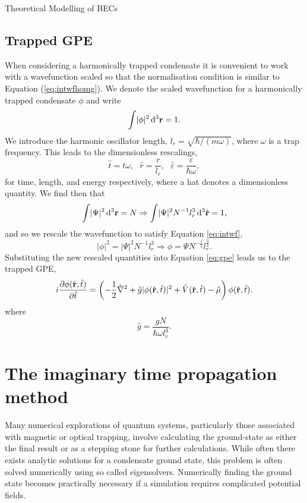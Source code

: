 \begin{chapter}{\label{cha:theoretical_model}Theoretical Modelling of BECs}
	\subsection{\label{section:gpedimlesstrap} Trapped GPE}
		When considering a harmonically trapped condensate it is convenient to work with a wavefunction scaled so that the normalisation condition is similar to Equation (\ref{eq:intwfhomg}). We denote the scaled wavefunction for a harmonically trapped condensate $\phi$ and write
		\begin{equation}\label{eq:intwf}
			\int \! |\phi|^2 \, \mathrm{d}^3{\bf r} = 1.
		\end{equation}
		We introduce the harmonic oscillator length, $l_r = \sqrt{\hbar/(m\omega)}$, where $\omega$ is a trap frequency. This leads to the dimensionless rescalings,
		\begin{equation}
			\hat{t} = t\omega, ~~~ \hat{r} = \frac{r}{l_r}, ~~~ \hat{\varepsilon}= \frac{\varepsilon}{\hbar\omega},
		\end{equation}
		for time, length, and energy respectively, where a hat denotes a dimensionless quantity.
		We find then that
		\begin{equation}
			\int \! |\Psi|^2 \, \mathrm{d}^3{\bf r} = N \Rightarrow \int \! |\Psi|^2 N^{-1} l_r^3 \, \mathrm{d}^3\hat{\bf r} = 1,
		\end{equation}
		and so we rescale the wavefunction to satisfy Equation \ref{eq:intwf},
		\begin{equation}
			 |\phi|^2 = |\Psi|^2 N^{-1} l_r^3 \Rightarrow \phi = \Psi N^{-\frac{1}{2}} l_r^\frac{3}{2}.
		\end{equation}
	Substituting the new rescaled quantities into Equation \ref{eq:gpe} leads us to the trapped GPE,
	\begin{equation}\label{eq:dimgpetrapped}
		i\frac{\partial\phi({\hat{\bf r}},\hat{t})}{\partial {\hat{t}}} = \left( -\frac{1}{2}\hat{\nabla}^2 + \hat{g}|\phi({\hat{\bf r}},\hat{t})|^2 + \hat{V}({\hat{\bf r}},\hat{t}) - \hat{\mu} \right) \phi({\hat{\bf r}},\hat{t}).
	\end{equation}
	where
	\begin{equation}
		 \hat{g} = \frac{gN}{\hbar \omega l_r^3}.
	\end{equation}
\section{\label{section:imagTime} The imaginary time propagation method}

	Many numerical explorations of quantum systems, particularly those associated with magnetic or optical trapping,  involve calculating the ground-state as either the final result or as a stepping stone for further calculations. While often there exists analytic solutions for a condensate ground state, this problem is often solved numerically using so called eigensolvers. Numerically finding the ground state becomes practically necessary if a simulation requires complicated potential fields.


\end{chapter}
